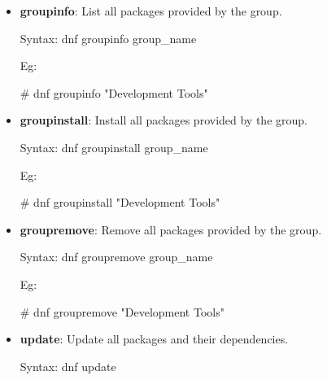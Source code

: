 \begin{flushleft}
\begin{itemize}
		\item \textbf{groupinfo}: List all packages provided by the group.
		\begin{tcolorbox}[breakable,notitle,boxrule=-0pt,colback=pink,colframe=pink]
			\color{black}
			\font=9pt
			Syntax: dnf groupinfo group\_name 
			\font=4pt
		\end{tcolorbox}
		Eg:
		\begin{tcolorbox}[breakable,notitle,boxrule=-0pt,colback=black,colframe=black]
			\color{green}
			\font=9pt
			\# dnf groupinfo "Development Tools"
			\font=4pt
		\end{tcolorbox}
		\bigskip
		\bigskip	
		
		\item \textbf{groupinstall}: Install all packages provided by the group.
		\begin{tcolorbox}[breakable,notitle,boxrule=-0pt,colback=pink,colframe=pink]
			\color{black}
			\font=9pt
			Syntax: dnf groupinstall group\_name 
			\font=4pt
		\end{tcolorbox}
		Eg:
		\begin{tcolorbox}[breakable,notitle,boxrule=-0pt,colback=black,colframe=black]
			\color{green}
			\font=9pt
			\# dnf groupinstall "Development Tools"
			\font=4pt
		\end{tcolorbox}
		\bigskip
		\bigskip	
		
		\item \textbf{groupremove}: Remove all packages provided by the group.
		\begin{tcolorbox}[breakable,notitle,boxrule=-0pt,colback=pink,colframe=pink]
			\color{black}
			\font=9pt
			Syntax: dnf groupremove group\_name 
			\font=4pt
		\end{tcolorbox}
		Eg:
		\begin{tcolorbox}[breakable,notitle,boxrule=-0pt,colback=black,colframe=black]
			\color{green}
			\font=9pt
			\# dnf groupremove "Development Tools"
			\font=4pt
		\end{tcolorbox}
		\bigskip
		\bigskip	



		\item \textbf{update}: Update all packages and their dependencies.
		\begin{tcolorbox}[breakable,notitle,boxrule=-0pt,colback=pink,colframe=pink]
			\color{black}
			\font=9pt
			Syntax: dnf update
			\font=4pt
		\end{tcolorbox}
		\bigskip
		\bigskip	


\end{itemize}
\end{flushleft}
